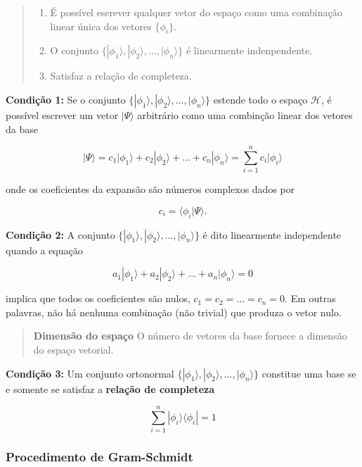 \documentclass[11pt]{article}
\begin{document}
\begin{quote}
\begin{enumerate}
\def\labelenumi{\arabic{enumi}.}
\item
  É possível escrever qualquer vetor do espaço como uma combinação
  linear única dos vetores \(\{ \phi_i \}\).
\item
  O conjunto
  \(\{ |\phi_1\rangle, |\phi_2\rangle, \dots,|\phi_n\rangle \}\) é
  linearmente indenpendente.
\item
  Satisfaz a relação de completeza.
\end{enumerate}
\end{quote}

\textbf{Condição 1:} Se o conjunto
\(\{ |\phi_1\rangle, |\phi_2\rangle, \dots,|\phi_n\rangle \}\) estende
todo o espaço \(\mathcal{H}\), é possível escrever um vetor
\(|\Psi\rangle\) arbitrário como uma combinção linear dos vetores da
base

\[ |\Psi\rangle = c_1 |\phi_1\rangle + c_2 |\phi_2\rangle + \dots + c_n |\phi_n\rangle = \sum_{i=1}^n c_i |\phi_i\rangle\]

onde os coeficientes da expansão são números complexos dados por

\[ c_i = \langle \phi_i | \Psi \rangle.\]

\textbf{Condição 2:} A conjunto
\(\{ |\phi_1\rangle, |\phi_2\rangle, \dots,|\phi_n\rangle \}\) é dito
linearmente independente quando a equação

\[ a_1 |\phi_1\rangle + a_2 |\phi_2\rangle + \dots + a_n |\phi_n\rangle = 0\]

implica que todos os coeficientes são nulos, \(c_1=c_2=...=c_n=0\). Em
outras palavras, não há nenhuma combinação (não trivial) que produza o
vetor nulo.

\begin{quote}
\textbf{Dimensão do espaço} O número de vetores da base fornece a
dimensão do espaço vetorial.
\end{quote}

\textbf{Condição 3:} Um conjunto ortonormal
\(\{ |\phi_1\rangle, |\phi_2\rangle, \dots,|\phi_n\rangle \}\) constitue
uma base se e somente se satisfaz a \textbf{relação de completeza}

\[ \sum_{i=1}^n |\phi_i\rangle \langle \phi_i| = 1 \]

\hypertarget{procedimento-de-gram-schmidt}{%
\subsubsection{Procedimento de
Gram-Schmidt}\label{procedimento-de-gram-schmidt}}
\end{document}
